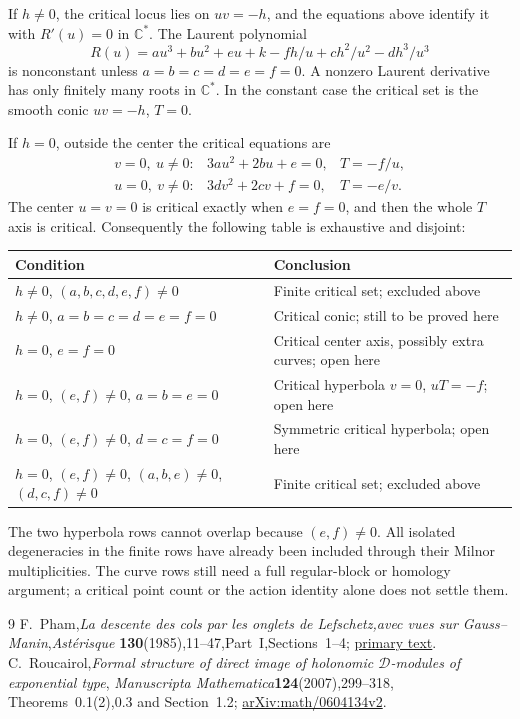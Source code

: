 \documentclass[11pt]{article}
\theoremstyle{definition}\newtheorem{definition}[theorem]{Definition}
\theoremstyle{remark}\newtheorem{remark}[theorem]{Remark}
\newcommand{\C}{\mathbb C}
\begin{document}
If $h\ne0$, the critical locus lies on $uv=-h$, and the equations
above identify it with $R'(u)=0$ in $\C^*$. The Laurent polynomial
\[
 R(u)=a u^3+b u^2+e u+k-fh/u+ch^2/u^2-dh^3/u^3
\]
is nonconstant unless $a=b=c=d=e=f=0$. A nonzero Laurent
derivative has only finitely many roots in $\C^*$. In the constant
case the critical set is the smooth conic $uv=-h$, $T=0$.

If $h=0$, outside the center the critical equations are
\[
 \begin{array}{lll}
 v=0,\ u\ne0:&3au^2+2bu+e=0,&T=-f/u,\\
 u=0,\ v\ne0:&3dv^2+2cv+f=0,&T=-e/v.
 \end{array}
\]
The center $u=v=0$ is critical exactly when $e=f=0$, and then
the whole $T$ axis is critical. Consequently the following table
is exhaustive and disjoint:
\begin{center}\small
\begin{tabular}{@{}p{}p{}@{}}
\toprule
Condition & Conclusion\\
\midrule
$h\ne0$, $(a,b,c,d,e,f)\ne0$ & Finite critical set; excluded above\\
$h\ne0$, $a=b=c=d=e=f=0$ & Critical conic; still to be proved here\\
$h=0$, $e=f=0$ & Critical center axis, possibly extra curves; open here\\
$h=0$, $(e,f)\ne0$, $a=b=e=0$ & Critical hyperbola $v=0$, $uT=-f$; open here\\
$h=0$, $(e,f)\ne0$, $d=c=f=0$ & Symmetric critical hyperbola; open here\\
$h=0$, $(e,f)\ne0$, $(a,b,e)\ne0$, $(d,c,f)\ne0$
 & Finite critical set; excluded above\\
\bottomrule
\end{tabular}
\end{center}
The two hyperbola rows cannot overlap because $(e,f)\ne0$.
All isolated degeneracies in the finite rows have already been
included through their Milnor multiplicities. The curve rows
still need a full regular-block or homology argument; a critical
point count or the action identity alone does not settle them.
\begin{thebibliography}{9}
F.~Pham,\emph{La descente des cols par les onglets de
Lefschetz,avec vues sur Gauss--Manin},\emph{Ast\'erisque}
\textbf{130}(1985),11--47,Part~I,Sections~1--4;
\href{https://numdam.org/item/AST_1985__130__11_0/}{primary text}.
C.~Roucairol,\emph{Formal structure of direct
image of holonomic $\mathcal D$-modules of exponential type},
\emph{Manuscripta Mathematica}\textbf{124}(2007),299--318,
Theorems~0.1(2),0.3 and Section~1.2;
\href{https://arxiv.org/abs/math/0604134v2}{arXiv:math/0604134v2}.
\end{thebibliography}
\end{document}
